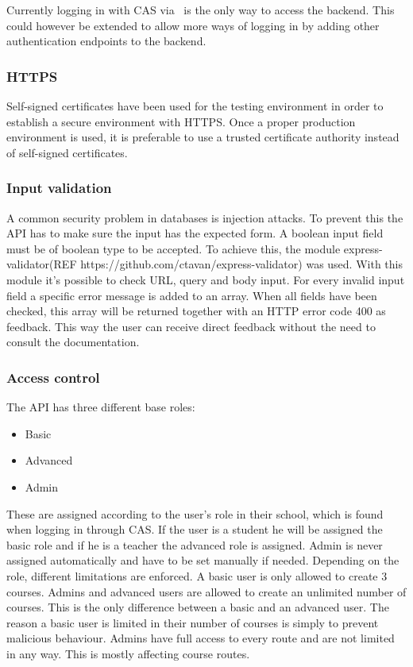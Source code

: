 Currently logging in with CAS via \LTU\ is the only way to access the backend. This could however be extended to allow more ways of logging in by adding other authentication endpoints to the backend.

\subsubsection{HTTPS} \label{https}
Self-signed certificates have been used for the testing environment in order to establish a secure environment with HTTPS. Once a proper production environment is used, it is preferable to use a trusted certificate authority instead of self-signed certificates.

\subsubsection{Input validation}
A common security problem in databases is injection attacks. To prevent this the API has to make sure the input has the expected form. A boolean input field must be of boolean type to be accepted. To achieve this, the module express-validator(REF https://github.com/ctavan/express-validator) was used. With this module it's possible to check URL, query and body input. For every invalid input field a specific error message is added to an array. When all fields have been checked, this array will be returned together with an HTTP error code 400 as feedback. This way the user can receive direct feedback without the need to consult the documentation.

\subsubsection{Access control}
The API has three different base roles:
\begin{itemize}
\item Basic
\item Advanced
\item Admin
\end{itemize}
These are assigned according to the user's role in their school, which is found when logging in through CAS. If the user is a student he will be assigned the basic role and if he is a teacher the advanced role is assigned. Admin is never assigned automatically and have to be set manually if needed. Depending on the role, different limitations are enforced. A basic user is only allowed to create 3 courses. Admins and advanced users are allowed to create an unlimited number of courses. This is the only difference between a basic and an advanced user. The reason a basic user is limited in their number of courses is simply to prevent malicious behaviour. Admins have full access to every route and are not limited in any way. This is mostly affecting course routes.

